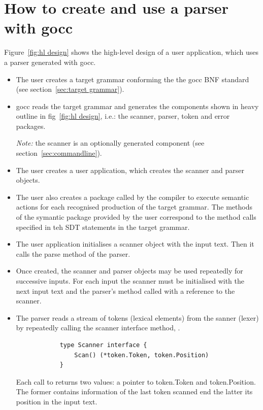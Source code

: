 \documentclass[12pt]{article}
\begin{document}
\section{How to create and use a parser with gocc}
	Figure~\ref{fig:hl design} shows the high-level design of a user application, which uses a parser generated with gocc.
	\begin{itemize}
		\item The user creates a target grammar conforming the the gocc BNF standard (see section~\ref{sec:target grammar}).

		\item gocc reads the target grammar and generates the components shown in heavy outline in fig~\ref{fig:hl design}, i.e.: the scanner, parser, token and error packages. 

		{\em Note:} the scanner is an optionally generated component (see section~\ref{sec:commandline}).

		\item The user creates a user application, which creates the scanner and parser objects. 

		\item The user also creates a package called by the compiler to execute semantic actions for each recognised production of the target grammar. The methods of the symantic package provided by the user correspond to the method calls specified in teh SDT statements in the target grammar.

		\item The user application initialises a scanner object with the input text. Then it calls the parse method of the parser.

		\item Once created, the scanner and parser objects may be used repeatedly for successive inputs. For each input the scanner must be initialised with the next input text and the parser's  method called with a reference to the scanner.	

		\item The parser reads a stream of tokens (lexical elements) from the sanner (lexer) by repeatedly calling the scanner interface method, . 

		\begin{verbatim}
			type Scanner interface {
			    Scan() (*token.Token, token.Position)
			}
		\end{verbatim}

		Each call to  returns two values: a pointer to token.Token and token.Position. The former contains information of the last token scanned end the latter its position in the input text.


\end{itemize}
\end{document}
